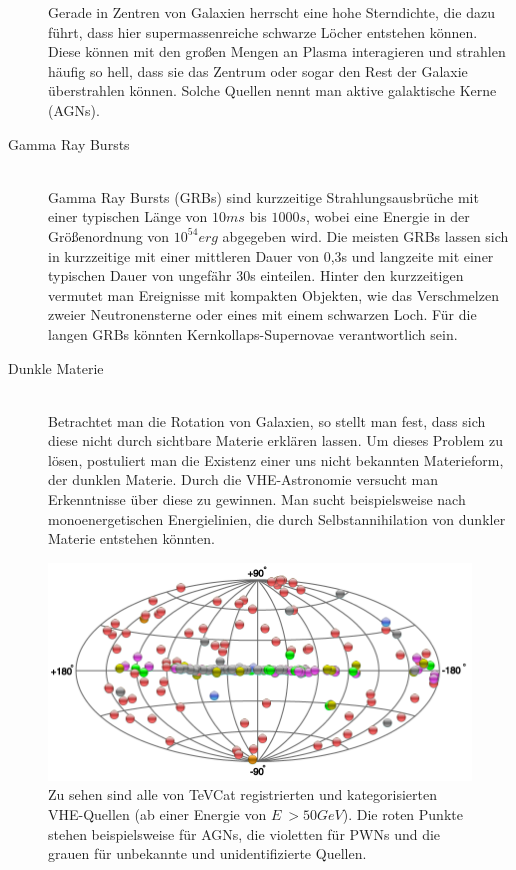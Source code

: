 \begin{description}
Gerade in Zentren von Galaxien herrscht eine hohe Sterndichte, die dazu führt, dass hier supermassenreiche schwarze Löcher entstehen können. Diese können mit den großen Mengen an Plasma interagieren und strahlen häufig so hell, dass sie das Zentrum oder sogar den Rest der Galaxie überstrahlen können. Solche Quellen nennt man aktive galaktische Kerne (AGNs).
\item[Gamma Ray Bursts]\hfill \\
Gamma Ray Bursts (GRBs) sind kurzzeitige Strahlungsausbrüche mit einer typischen Länge von $10\unit{ms}$ bis $1000\unit{s}$, wobei eine Energie in der Größenordnung von $10^{54}\unit{erg}$ abgegeben wird. %
Die meisten GRBs lassen sich in kurzzeitige mit einer mittleren Dauer von 0,3s und langzeite mit einer typischen Dauer von ungefähr 30s einteilen. Hinter den kurzzeitigen vermutet man Ereignisse mit kompakten Objekten, wie das Verschmelzen zweier Neutronensterne oder eines mit einem schwarzen Loch. Für die langen GRBs könnten Kernkollaps-Supernovae verantwortlich sein.
\item[Dunkle Materie]\hfill \\
Betrachtet man die Rotation von Galaxien, so stellt man fest, dass sich diese nicht durch sichtbare Materie erklären lassen. Um dieses Problem zu lösen, postuliert man die Existenz einer uns nicht bekannten Materieform, der dunklen Materie. Durch die VHE-Astronomie versucht man Erkenntnisse über diese zu gewinnen. Man sucht beispielsweise nach monoenergetischen Energielinien, die durch Selbstannihilation von dunkler Materie entstehen könnten.
\end{description}

\begin{figure}[htbp]
\centering
\includegraphics[width=\textwidth]{Images/tevcat.png}
\caption{Zu sehen sind alle von TeVCat registrierten und kategorisierten VHE-Quellen (ab einer Energie von $E~>50\unit{GeV}$\cite{TeVCat2}). Die roten Punkte stehen beispielsweise für AGNs, die violetten für PWNs und die grauen für unbekannte und unidentifizierte Quellen. \cite{TevCat}}
\label{img:tevcat}
\end{figure}


